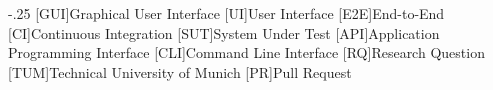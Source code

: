 
\begin{acronym}
    \itemsep-.25\baselineskip
    [GUI]{Graphical User Interface}
    [UI]{User Interface}
    [E2E]{End-to-End}
    [CI]{Continuous Integration}
    [SUT]{System Under Test}
    [API]{Application Programming Interface}
    [CLI]{Command Line Interface}
    [RQ]{Research Question}
    [TUM]{Technical University of Munich}
    [PR]{Pull Request}
\end{acronym}
